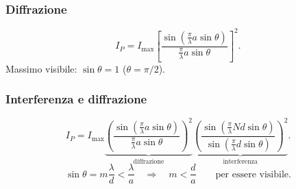 \subsubsection*{Diffrazione}
\[
I_P=I_{\max}\left[\frac{\sin(\frac\pi\lambda a\sin\theta)}
{\frac\pi\lambda a\sin\theta}\right]^2.
\]
Massimo visibile: $\sin\theta=1$ ($\theta=\pi/2$).
\subsubsection*{Interferenza e diffrazione}
\[
I_P=I_{\max}
\underbrace{\left(\frac{\sin(\frac\pi\lambda a\sin\theta)}
{\frac\pi\lambda a\sin\theta}\right)^2}_{\text{diffrazione}}
\underbrace{\left(\frac{\sin(\frac\pi\lambda Nd\sin\theta)}
{\sin(\frac\pi\lambda d\sin\theta)}\right)^2}_{\text{interferenza}}.
\]
\[
\sin\theta=m\frac\lambda d<\frac\lambda a
\quad\Longrightarrow\quad m<\frac da\qquad\text{per essere visibile}.
\]
